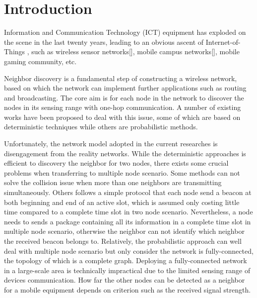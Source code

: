 \section{Introduction}



Information and Communication Technology (ICT) equipment \cite{zeadally2012energy} has exploded 
on the scene in the last twenty years, leading to an obvious ascent of Internet-of-Things \cite{atzori2010internet},
such as wireless sensor networks[], mobile campus networks[], mobile gaming community, etc.


Neighbor discovery is a fundamental step of constructing a wireless network, based on 
which the network can implement further applications such as routing and broadcasting.
The core aim is for each node in the network to discover the nodes in its sensing range 
with one-hop communication. A number of existing works \cite{dutta2008practical,kandhalu2010u,
bakht2012searchlight,sun2014hello,chen2015heterogeneous,
wang2015blinddate,qiu2016talk,mcglynn2001birthday,
vasudevan2009neighbor,you2011aloha,song2014probabilistic} have been proposed 
to deal with this issue, some of which are based on deterministic techniques while others
are probabilistic methods.


Unfortunately, the network model adopted in the current researches is disengagement from the reality networks.
While the deterministic approaches is efficient to discovery the neighbor
for two nodes, there exists some crucial problems when transferring to multiple node scenario.
Some methods can not solve the collision issue when more than one neighbors are transmitting simultaneously. 
Others follows a simple protocol that each node send a beacon at both beginning and end of an active slot, 
which is assumed only costing little time compared to a complete time slot in two node scenario. Nevertheless,
a node needs to sends a package containing all its information in a complete time slot in multiple node scenario,
otherwise the neighbor can not identify which neighbor the received beacon belongs to.
Relatively, the probabilistic approach can well deal with multiple node scenario but only consider
the network is fully-connected, the topology of which is a complete graph. 
Deploying a fully-connected network in a large-scale area is technically impractical 
due to the limited sensing range of devices communication.
How far the other nodes can be detected as a neighbor for a mobile equipment  
depends on criterion such as the received signal strength.

